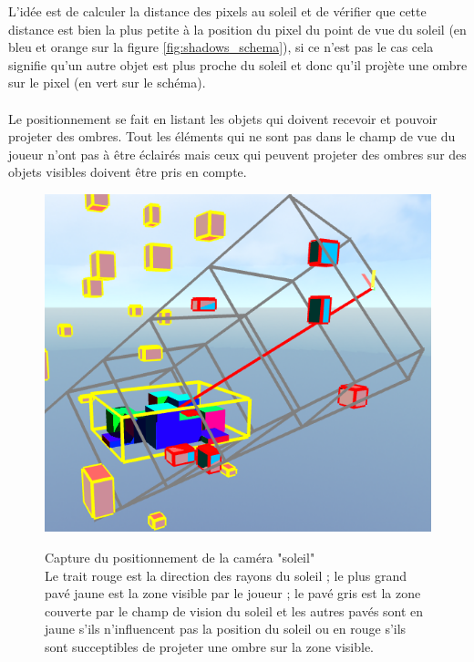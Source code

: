 \documentclass{EPUProjetDi}
\begin{document}
L'idée est de calculer la distance des pixels au soleil et de vérifier que cette distance est bien la plus petite à la position du pixel du point de vue du soleil (en bleu et orange sur la figure \ref{fig:shadows_schema}), si ce n'est pas le cas cela signifie qu'un autre objet est plus proche du soleil et donc qu'il projète une ombre sur le pixel (en vert sur le schéma).

\paragraph{}
Le positionnement se fait en listant les objets qui doivent recevoir et pouvoir projeter des ombres. Tout les éléments qui ne sont pas dans le champ de vue du joueur n'ont pas à être éclairés mais ceux qui peuvent projeter des ombres sur des objets visibles doivent être pris en compte.

\begin{figure}
	\centering
	\caption[Capture du positionnement de la caméra "soleil"]{Capture du positionnement de la caméra "soleil"\\Le trait rouge est la direction des rayons du soleil ; le plus grand pavé jaune est la zone visible par le joueur ; le pavé gris est la zone couverte par le champ de vision du soleil et les autres pavés sont en jaune s'ils n'influencent pas la position du soleil ou en rouge s'ils sont succeptibles de projeter une ombre sur la zone visible.}
	\includegraphics[scale=.49]{casted_shadows}
	\label{fig:sun_camera_position}
	\vspace{-10pt}
\end{figure}
\end{document}
